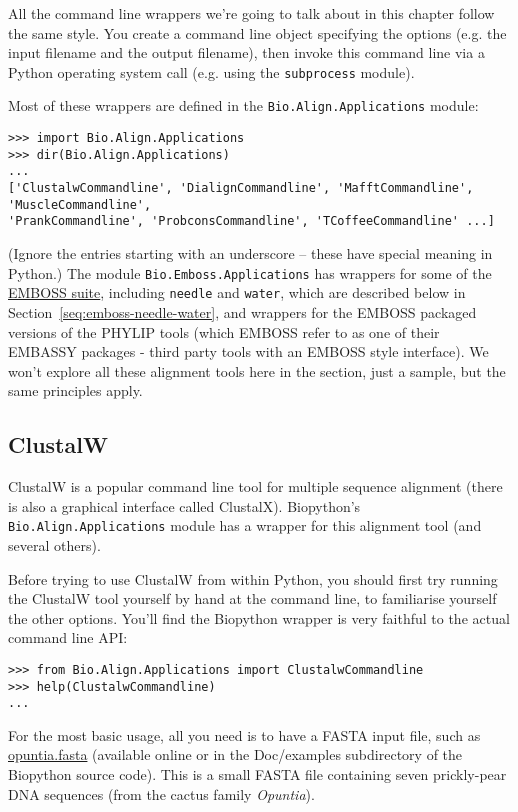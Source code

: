 \documentclass{report}
\begin{document}
All the command line wrappers we're going to talk about in this chapter follow the same style.
You create a command line object specifying the options (e.g. the input filename and the
output filename), then invoke this command line via a Python operating system call (e.g.
using the \texttt{subprocess} module).

Most of these wrappers are defined in the \verb|Bio.Align.Applications| module:

\begin{verbatim}
>>> import Bio.Align.Applications
>>> dir(Bio.Align.Applications)
...
['ClustalwCommandline', 'DialignCommandline', 'MafftCommandline', 'MuscleCommandline',
'PrankCommandline', 'ProbconsCommandline', 'TCoffeeCommandline' ...]
\end{verbatim}

\noindent (Ignore the entries starting with an underscore -- these have
special meaning in Python.)
The module \verb|Bio.Emboss.Applications| has wrappers for some of the
\href{http://emboss.sourceforge.net/}{EMBOSS suite}, including
\texttt{needle} and \texttt{water}, which are described below in
Section~\ref{seq:emboss-needle-water}, and wrappers for the EMBOSS
packaged versions of the PHYLIP tools (which EMBOSS refer to as one
of their EMBASSY packages - third party tools with an EMBOSS style
interface).
We won't explore all these alignment tools here in the section, just a
sample, but the same principles apply.

\subsection{ClustalW}
\label{sec:align_clustal}
ClustalW is a popular command line tool for multiple sequence alignment
(there is also a graphical interface called ClustalX). Biopython's
\verb|Bio.Align.Applications| module has a wrapper for this alignment tool
(and several others).

Before trying to use ClustalW from within Python, you should first try running
the ClustalW tool yourself by hand at the command line, to familiarise
yourself the other options. You'll find the Biopython wrapper is very
faithful to the actual command line API:

\begin{verbatim}
>>> from Bio.Align.Applications import ClustalwCommandline
>>> help(ClustalwCommandline)
...
\end{verbatim}

For the most basic usage, all you need is to have a FASTA input file, such as
\href{http://biopython.org/DIST/docs/tutorial/examples/opuntia.fasta}{opuntia.fasta}
(available online or in the Doc/examples subdirectory of the Biopython source
code). This is a small FASTA file containing seven prickly-pear DNA sequences
(from the cactus family \textit{Opuntia}).
\end{document}
